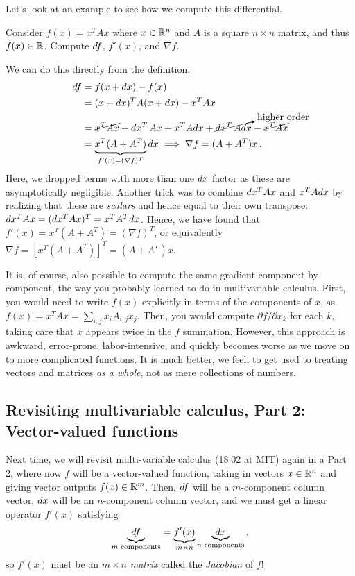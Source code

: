 Let's look at an example to see how we compute this differential.

\begin{example}
    Consider $f(x) = x^T Ax$ where $x\in \mathbb R^n$ and $A$ is a square $n\times n$ matrix, and thus $f(x) \in \mathbb R$. Compute $d f$, $f'(x)$, and $\nabla f$.
\end{example}

We can do this directly from the definition.
\begin{align*}
    d f &= f(x+ d x) - f(x) \\
    &=  (x+ d x)^T A (x+d x) - x^T A x \\
    &= \cancel{x^T A x} + d x^T\, Ax + x^T A d x + \cancelto{\text{higher order}}{d x^T \,A d x} - \cancel{x^T A x} \\
    &= \underbrace{x^T(A+A^T)}_{f'(x)=(\nabla f)^T }d x \implies \nabla f = (A+A^T)x \, .
\end{align*}
Here, we dropped terms with more than one $d x$ factor as these are asymptotically negligible.  Another trick was to combine $d x^T A x$ and $x^T A d x$ by realizing that these are \emph{scalars} and hence equal to their own transpose: $dx^T A x = (d x^T A x)^T = x^T A^T d x$. Hence, we have found that $f'(x) = x^T(A+A^T) = (\nabla f)^T$, or equivalently $\nabla f = [x^T(A+A^T)]^T = (A+A^T)x$.

It is, of course, also possible to compute the same gradient component-by-component, the way you probably learned to do in multivariable calculus.  First, you would need to write $f(x)$ explicitly in terms of the components of $x$, as $f(x) = x^T A x = \sum_{i,j} x_i A_{i,j} x_j$.  Then, you would compute $\partial f/\partial x_k$ for each $k$, taking care that $x$ appears twice in the $f$ summation.  However, this approach is awkward, error-prone, labor-intensive, and quickly becomes worse as we move on to more complicated functions.  It is much better, we feel, to get used to treating vectors and matrices \emph{as a whole}, not as mere collections of numbers.

\subsection{Revisiting multivariable calculus, Part 2: Vector-valued functions}

Next time, we will revisit multi-variable calculus (18.02 at MIT) again in a Part 2, where now $f$ will be a vector-valued function, taking in vectors $x\in \mathbb R^n$ and giving vector outputs $f(x) \in \mathbb R^m$. Then, $d f$ will be a $m$-component column vector, $d x$ will be an $n$-component column vector, and we must get a linear operator $f'(x)$ satisfying
\[
\underbrace{d f}_{m\text{ components}} = \underbrace{f'(x)}_{m \times n} \underbrace{d x}_{n\text{ components}} \, ,
\]
so $f'(x)$ must be an $m \times n$ \emph{matrix} called the \textit{Jacobian} of $f$!

